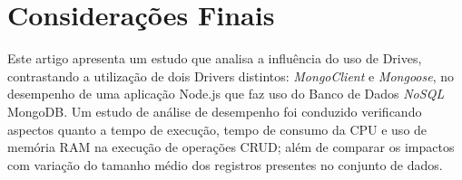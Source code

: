 \documentclass{svproc}
\begin{document}



\section{Considerações Finais}
\label{section:consideracoes}

Este artigo apresenta um estudo que analisa a influência do uso de Drives, contrastando a utilização de dois Drivers distintos: \emph{MongoClient} e \emph{Mongoose}, no desempenho de uma aplicação Node.js que faz uso do Banco de Dados \emph{NoSQL} MongoDB.%
Um estudo de análise de desempenho foi conduzido verificando aspectos quanto a tempo de execução, tempo de consumo da CPU e uso de memória RAM na execução de operações CRUD; além de comparar os impactos com variação do tamanho médio dos registros presentes no conjunto de dados.
\end{document}
